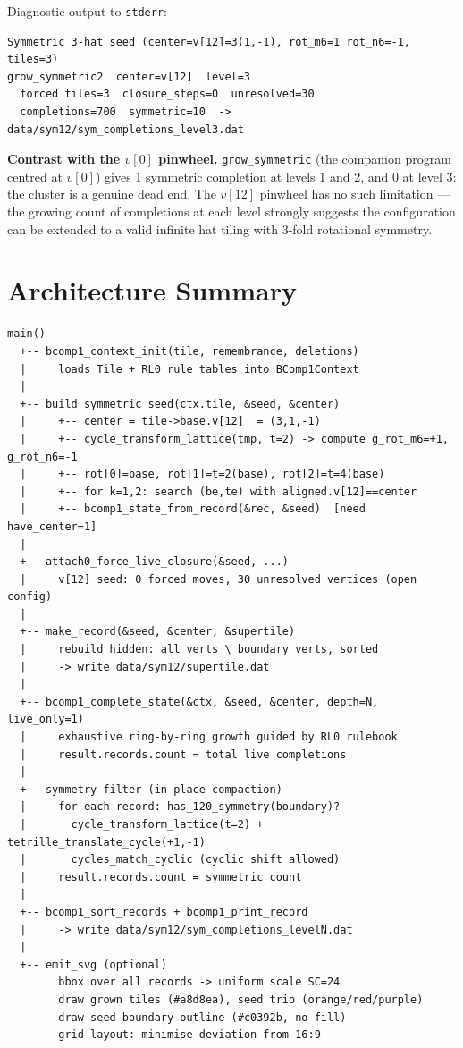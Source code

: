 \documentclass[10pt,a4paper]{article}
\let\polysection\section
\renewcommand\section{\needspace{0.16\textheight}\polysection}
\newcommand{\code}[1]{\texttt{\small #1}}
\begin{document}
\medskip
\noindent Diagnostic output to \code{stderr}:

\begin{verbatim}
Symmetric 3-hat seed (center=v[12]=3(1,-1), rot_m6=1 rot_n6=-1, tiles=3)
grow_symmetric2  center=v[12]  level=3
  forced tiles=3  closure_steps=0  unresolved=30
  completions=700  symmetric=10  ->  data/sym12/sym_completions_level3.dat
\end{verbatim}

\medskip
\noindent\textbf{Contrast with the $v[0]$ pinwheel.}
\code{grow\_symmetric} (the companion program centred at $v[0]$) gives
1 symmetric completion at levels 1 and 2, and 0 at level 3: the cluster
is a genuine dead end.  The $v[12]$ pinwheel has no such limitation — the
growing count of completions at each level strongly suggests the configuration
can be extended to a valid infinite hat tiling with 3-fold rotational symmetry.

\section{Architecture Summary}

\begin{center}
\begin{tcolorbox}[
  colframe=rulecolor, colback=white, boxrule=0.6pt, arc=3pt,
  width=0.98\linewidth
]
\begin{verbatim}
main()
  +-- bcomp1_context_init(tile, remembrance, deletions)
  |     loads Tile + RL0 rule tables into BComp1Context
  |
  +-- build_symmetric_seed(ctx.tile, &seed, &center)
  |     +-- center = tile->base.v[12]  = (3,1,-1)
  |     +-- cycle_transform_lattice(tmp, t=2) -> compute g_rot_m6=+1, g_rot_n6=-1
  |     +-- rot[0]=base, rot[1]=t=2(base), rot[2]=t=4(base)
  |     +-- for k=1,2: search (be,te) with aligned.v[12]==center
  |     +-- bcomp1_state_from_record(&rec, &seed)  [need have_center=1]
  |
  +-- attach0_force_live_closure(&seed, ...)
  |     v[12] seed: 0 forced moves, 30 unresolved vertices (open config)
  |
  +-- make_record(&seed, &center, &supertile)
  |     rebuild_hidden: all_verts \ boundary_verts, sorted
  |     -> write data/sym12/supertile.dat
  |
  +-- bcomp1_complete_state(&ctx, &seed, &center, depth=N, live_only=1)
  |     exhaustive ring-by-ring growth guided by RL0 rulebook
  |     result.records.count = total live completions
  |
  +-- symmetry filter (in-place compaction)
  |     for each record: has_120_symmetry(boundary)?
  |       cycle_transform_lattice(t=2) + tetrille_translate_cycle(+1,-1)
  |       cycles_match_cyclic (cyclic shift allowed)
  |     result.records.count = symmetric count
  |
  +-- bcomp1_sort_records + bcomp1_print_record
  |     -> write data/sym12/sym_completions_levelN.dat
  |
  +-- emit_svg (optional)
        bbox over all records -> uniform scale SC=24
        draw grown tiles (#a8d8ea), seed trio (orange/red/purple)
        draw seed boundary outline (#c0392b, no fill)
        grid layout: minimise deviation from 16:9
\end{verbatim}
\end{tcolorbox}
\end{center}
\end{document}
